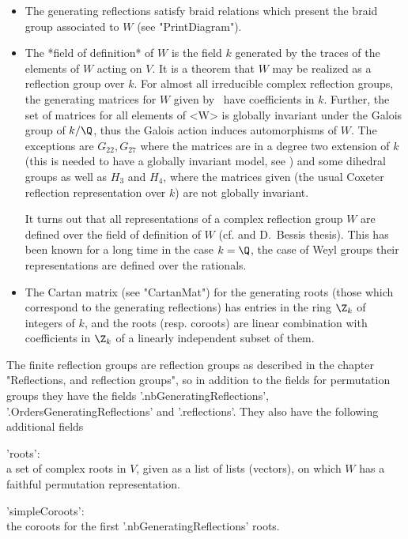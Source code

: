 \begin{itemize}
\item  The generating reflections satisfy braid relations which present the
braid group associated to $W$ (see "PrintDiagram").
\item
The  *field of definition* of $W$ is  the field $k$ generated by the traces
of  the elements  of $W$  acting on  $V$. It  is a  theorem that $W$ may be
realized as a reflection group over $k$. For almost all irreducible complex
reflection  groups, the generating matrices for  $W$ given by \CHEVIE\ have
coefficients  in $k$. Further, the set of  matrices for all elements of <W>
is  globally invariant  under the  Galois group  of $k/\Q$, thus the Galois
action  induces automorphisms of  $W$. The exceptions  are $G_{22}, G_{27}$
where  the matrices are in a degree two extension of $k$ (this is needed to
have  a  globally  invariant  model,  see  \cite{MarinMichel10})  and  some
dihedral  groups as well as $H_3$ and  $H_4$, where the matrices given (the
usual   Coxeter  reflection  representation  over  $k$)  are  not  globally
invariant.

It turns out that all representations of a complex reflection group $W$ are
defined over the field of definition of $W$ (cf. \cite{Ben76} and D.~Bessis
thesis).  This has been known for a long  time in the case $k=\Q$, the case
of Weyl groups\: their representations are defined over the rationals.
\item  The Cartan matrix (see "CartanMat")  for the generating roots (those
which  correspond to  the generating  reflections) has  entries in the ring
$\Z_k$  of  integers  of  $k$,  and  the  roots  (resp. coroots) are linear
combination with coefficients in $\Z_k$ of a linearly independent subset of
them.
\end{itemize}

The  finite reflection  groups are  reflection groups  as described  in the
chapter  "Reflections, and reflection groups", so in addition to the fields
for  permutation  groups  they  have the fields '.nbGeneratingReflections',
'.OrdersGeneratingReflections'  and  '.reflections'.  They  also  have  the
following additional fields\:

'roots':\\  a  set  of  complex  roots  in  $V$,  given  as a list of lists
       (vectors), on which $W$ has a faithful permutation representation.

'simpleCoroots':\\ the  coroots for the  first '.nbGeneratingReflections'
       roots.

